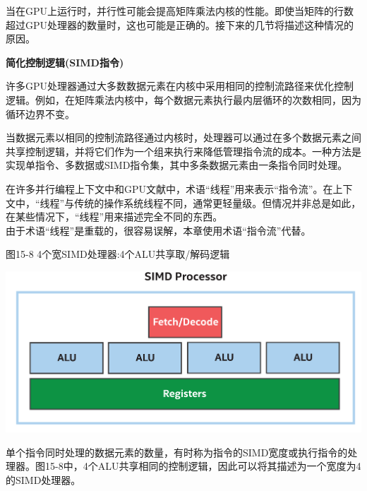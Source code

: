 当在GPU上运行时，并行性可能会提高矩阵乘法内核的性能。即使当矩阵的行数超过GPU处理器的数量时，这也可能是正确的。接下来的几节将描述这种情况的原因。\par

\hspace*{\fill} \par %
\textbf{简化控制逻辑(SIMD指令)}

许多GPU处理器通过大多数数据元素在内核中采用相同的控制流路径来优化控制逻辑。例如，在矩阵乘法内核中，每个数据元素执行最内层循环的次数相同，因为循环边界不变。\par

当数据元素以相同的控制流路径通过内核时，处理器可以通过在多个数据元素之间共享控制逻辑，并将它们作为一个组来执行来降低管理指令流的成本。一种方法是实现单指令、多数据或SIMD指令集，其中多条数据元素由一条指令同时处理。\par

\begin{tcolorbox}[colback=blue!5!white,colframe=blue!75!black, title=线程与指令流]
在许多并行编程上下文中和GPU文献中，术语“线程”用来表示“指令流”。在上下文中，“线程”与传统的操作系统线程不同，通常更轻量级。但情况并非总是如此，在某些情况下，“线程”用来描述完全不同的东西。\\

由于术语“线程”是重载的，很容易误解，本章使用术语“指令流”代替。
\end{tcolorbox}

\hspace*{\fill} \par %
图15-8 4个宽SIMD处理器:4个ALU共享取/解码逻辑
\begin{center}
	\includegraphics[width=1.0\textwidth]{content/chapter-15/images/6}
\end{center}

单个指令同时处理的数据元素的数量，有时称为指令的SIMD宽度或执行指令的处理器。图15-8中，4个ALU共享相同的控制逻辑，因此可以将其描述为一个宽度为4的SIMD处理器。\par

